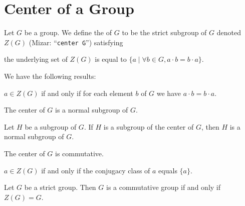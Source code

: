 \documentclass{article}
\begin{document}
\section{Center of a Group}

\begin{definition}
Let $G$ be a group.
We define the  of $G$ to be the strict subgroup of $G$
denoted $Z(G)$ (Mizar: ``\verb#center G#'') satisfying
\begin{defn}
\item the underlying set of $Z(G)$ is equal to $\{a\mid\forall b\in G,a\cdot b=b\cdot a\}$.
\end{defn}
\end{definition}

We have the following results:
\begin{thm}
\item\label{group5:77} $a\in Z(G)$ if and only if for each element $b$
  of $G$ we have $a\cdot b=b\cdot a$.
\item\label{group5:78} The center of $G$ is a normal subgroup of $G$.
\item\label{group5:79} Let $H$ be a subgroup of $G$. If $H$ is a
  subgroup of the center of $G$, then $H$ is a normal subgroup of $G$.
\item\label{group5:80} The center of $G$ is commutative.
\item\label{group5:81} $a\in Z(G)$ if and only if the conjugacy class of
  $a$ equals $\{a\}$.
\item\label{group5:82} Let $G$ be a strict group.
  Then $G$ is a commutative group if and only if $Z(G)=G$.
\end{thm}
\end{document}
